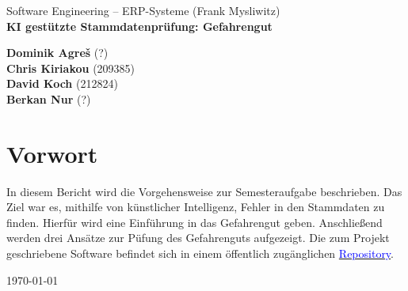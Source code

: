 \begin{titlepage}
    \begin{flushleft}
        Software Engineering -- ERP-Systeme (Frank Mysliwitz)\\

        \huge
        \textbf{KI gestützte Stammdatenprüfung: Gefahrengut}\\
        \vspace{1,5cm}

        \Large
        \textbf{Dominik Agreš} {\small (?)}\\
        \textbf{Chris Kiriakou} {\small (209385)}\\
        \textbf{David Koch} {\small (212824)}\\
        \textbf{Berkan Nur} {\small (?)}\\
        \vspace{1,5cm}
        
        \large
        \section*{Vorwort}
        In diesem Bericht wird die Vorgehensweise zur Semesteraufgabe beschrieben.
        Das Ziel war es, mithilfe von künstlicher Intelligenz, Fehler in den Stammdaten zu
        finden. Hierfür wird eine Einführung in das Gefahrengut geben. Anschließend werden
        drei Ansätze zur Püfung des Gefahrenguts aufgezeigt. 
        Die zum Projekt geschriebene Software befindet sich in einem öffentlich 
        zugänglichen \href{https://github.com/ckiri/wetterstation}{\textcolor{blue}{Repository}}.\\

        \vspace{2,5cm}

        \today \\

        \vspace{3,5cm}
    \end{flushleft}
\end{titlepage}
